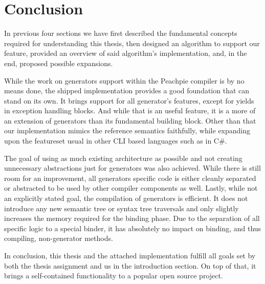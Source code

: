 \chapter*{Conclusion}

In previous four sections we have first described the fundamental concepts required for understanding this thesis, then designed an algorithm to support our feature, provided an overview of said algorithm's implementation, and, in the end, proposed possible expansions.

While the work on generators support within the Peachpie compiler is by no means done, the shipped implementation provides a good foundation that can stand on its own. It brings support for all generator’s features, except for yields in exception handling blocks. And while that is an useful feature, it is a more of an extension of generators than its fundamental building block. Other than that our implementation mimics the reference semantics faithfully, while expanding upon the featureset usual in other CLI based languages such as in C#.

The goal of using as much existing architecture as possible and not creating unnecessary abstractions just for generators was also achieved. While there is still room for an improvement, all generators specific code is either cleanly separated or abstracted to be used by other compiler components as well. 
Lastly, while not an explicitly stated goal, the compilation of generators is efficient. It does not introduce any new semantic tree or syntax tree traversals and only slightly increases the memory required for the binding phase. Due to the separation of all specific logic to a special binder, it has absolutely no impact on binding, and thus compiling, non-generator methods.

In conclusion, this thesis and the attached implementation fulfill all goals set by both the thesis assignment and us in the introduction section. On top of that, it brings a self-contained functionality to a popular open source project.
